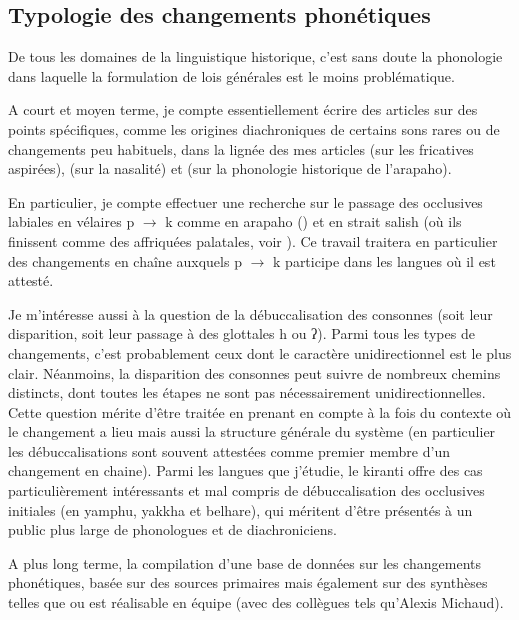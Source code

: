 \documentclass[oldfontcommands,oneside,a4paper,11pt]{article}
\newcommand{\ipa}[1]{{\phon #1}} %
\begin{document}
 



\subsection{Typologie des changements phonétiques } \label{sec:phonetique}
De tous les domaines de la linguistique historique, c'est sans doute la phonologie dans laquelle la formulation de lois générales est le moins problématique. 

A court et moyen terme, je compte essentiellement écrire des articles sur des points spécifiques, comme les origines diachroniques de certains sons rares ou de changements peu habituels, dans la lignée des mes articles \citet{jacques11lingua} (sur les fricatives aspirées), \citet{michaud-jacques12nasalite} (sur la nasalité) et \citet{jacques13arapaho} (sur la phonologie historique de l'arapaho). 

En particulier, je compte effectuer une recherche sur le passage des occlusives labiales en vélaires \ipa{*p} $\rightarrow$ \ipa{k}  comme en arapaho (\citealt{goddard74arapaho}) et en strait salish (où ils finissent comme des affriquées palatales, voir \citealt[10-11]{kuipers02salish}). Ce travail traitera en particulier des changements en chaîne auxquels \ipa{*p} $\rightarrow$ \ipa{k}  participe dans les langues où il est attesté.

Je m'intéresse aussi à la question de la débuccalisation des consonnes (soit leur disparition, soit leur passage à des glottales \ipa{h} ou \ipa{ʔ}). Parmi tous les types de changements, c'est probablement ceux dont le caractère unidirectionnel est le plus clair. Néanmoins, la disparition des consonnes peut suivre de nombreux chemins distincts, dont toutes les étapes ne sont pas nécessairement unidirectionnelles. Cette question mérite d'être traitée en prenant en compte à la fois du contexte où le changement a lieu mais aussi la structure générale du système (en particulier les débuccalisations sont souvent attestées comme premier membre d'un changement en chaine). Parmi les langues que j'étudie, le kiranti offre des cas particulièrement intéressants et mal compris de débuccalisation des occlusives initiales (en yamphu, yakkha et belhare), qui méritent d'être présentés à un public plus large de phonologues et de diachroniciens.


A plus long terme, la compilation d'une base de données sur les changements phonétiques, basée sur des sources primaires mais également sur des synthèses telles que  \citet{kuemmel07wandel} ou \citet{blevins04evolutionary, blevins08naturalness} est réalisable en équipe (avec des collègues tels qu'Alexis Michaud).
\end{document}
